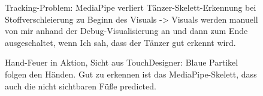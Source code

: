 \FloatBarrier
\begin{figure}[htbp]
    \centering
    \caption{Tracking-Problem: MediaPipe verliert Tänzer-Skelett-Erkennung bei Stoffverschleierung zu Beginn des Visuals -> Visuals werden manuell von mir anhand der Debug-Visualisierung an und dann zum Ende ausgeschaltet, wenn Ich sah, dass der Tänzer gut erkennt wird.}
    \label{fig:cloth_tracking_issue}
\end{figure}

\begin{figure}[htbp]
    \centering
    \caption{Hand-Feuer in Aktion, Sicht aus TouchDesigner: Blaue Partikel folgen den Händen. Gut zu erkennen ist das MediaPipe-Skelett, dass auch die nicht sichtbaren Füße predicted.}
    \label{fig:hand_fire_action}
\end{figure}

